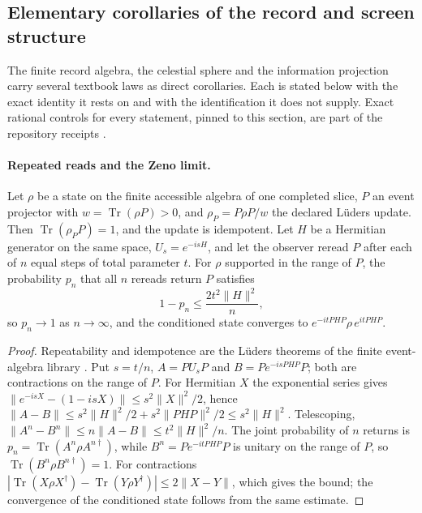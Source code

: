 \subsection{Elementary corollaries of the record and screen structure}
\label{sec:elementary-corollaries}

The finite record algebra, the celestial sphere and the information
projection carry several textbook laws as direct corollaries. Each is stated
below with the exact identity it rests on and with the identification it does
not supply. Exact rational controls for every statement, pinned to this
section, are part of the repository receipts \cite{ophrepo}.

\paragraph{Repeated reads and the Zeno limit.}

\begin{proposition}
\label{prop:zeno-limit}
Let \(\rho\) be a state on the finite accessible algebra of one completed
slice, \(P\) an event projector with \(w=\operatorname{Tr}(\rho P)>0\), and
\(\rho_P=P\rho P/w\) the declared L\"uders update. Then
\(\operatorname{Tr}(\rho_P P)=1\), and the update is idempotent. Let \(H\) be
a Hermitian generator on the same space, \(U_s=e^{-isH}\), and let the
observer reread \(P\) after each of \(n\) equal steps of total parameter
\(t\). For \(\rho\) supported in the range of \(P\), the probability
\(p_n\) that all \(n\) rereads return \(P\) satisfies
\[
 1-p_n\le \frac{2t^2\|H\|^2}{n},
\]
so \(p_n\to1\) as \(n\to\infty\), and the conditioned state converges to
\(e^{-itPHP}\rho\,e^{itPHP}\).
\end{proposition}

\begin{proof}
Repeatability and idempotence are the L\"uders theorems of the finite
event-algebra library \cite{ophconsensus,ophrepo}. Put \(s=t/n\),
\(A=PU_sP\) and \(B=Pe^{-isPHP}P\); both are contractions on the range of
\(P\). For Hermitian \(X\) the exponential series gives
\(\|e^{-isX}-(1-isX)\|\le s^2\|X\|^2/2\), hence
\(\|A-B\|\le s^2\|H\|^2/2+s^2\|PHP\|^2/2\le s^2\|H\|^2\). Telescoping,
\(\|A^n-B^n\|\le n\|A-B\|\le t^2\|H\|^2/n\). The joint probability of
\(n\) returns is \(p_n=\operatorname{Tr}(A^n\rho A^{n\dagger})\), while
\(B^n=Pe^{-itPHP}P\) is unitary on the range of \(P\), so
\(\operatorname{Tr}(B^n\rho B^{n\dagger})=1\). For contractions
\(|\operatorname{Tr}(X\rho X^\dagger)-\operatorname{Tr}(Y\rho Y^\dagger)|
\le2\|X-Y\|\), which gives the bound; the convergence of the conditioned
state follows from the same estimate.
\end{proof}

